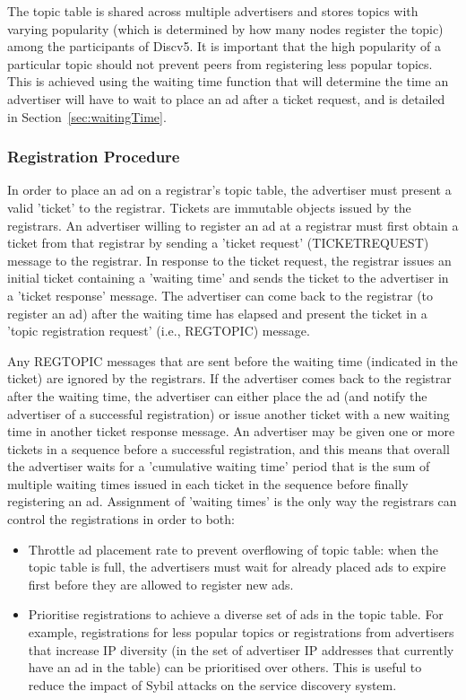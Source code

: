 The topic table is shared across multiple advertisers and stores topics with varying popularity (which is determined by how many nodes register the topic) among the participants of Discv5. 
It is important that the high popularity of a particular topic should not prevent peers from registering less popular topics. 
This is achieved using the waiting time function that will determine the time an advertiser will have to wait to place an ad after a ticket request,  and is detailed in Section~\ref{sec:waitingTime}.

\subsubsection{Registration Procedure}

In order to place an ad on a registrar's topic table, the advertiser must present a valid 'ticket' to the registrar. Tickets are immutable objects issued by the registrars. An advertiser willing to register an ad at a registrar must first obtain a ticket from that registrar by sending a 'ticket request' (TICKETREQUEST) message to the registrar. In response to the ticket request, the registrar issues an initial ticket containing a 'waiting time' and sends the ticket to the advertiser in a 'ticket response' message. The advertiser can come back to the registrar (to register an ad) after the waiting time has elapsed and present the ticket in a 'topic registration request' (i.e., REGTOPIC) message.

Any REGTOPIC messages that are sent before the waiting time (indicated in the ticket) are ignored by the registrars. If the advertiser comes back to the registrar after the waiting time, the advertiser can either place the ad (and notify the advertiser of a successful registration) or issue another ticket with a new waiting time in another ticket response message. An advertiser may be given one or more tickets in a sequence before a successful registration, and this means that overall the advertiser waits for a 'cumulative waiting time' period that is the sum of multiple waiting times issued in each ticket in the sequence before finally registering an ad. Assignment of 'waiting times' is the only way the registrars can control the registrations in order to both:

\begin{itemize}
    \item Throttle ad placement rate to prevent overflowing of topic table: when the topic table is full, the advertisers must wait for already placed ads to expire first before they are allowed to register new ads.
    \item Prioritise registrations to achieve a diverse set of ads in the topic table. For example, registrations for less popular topics or registrations from advertisers that increase IP diversity (in the set of advertiser IP addresses that currently have an ad in the table) can be prioritised over others. This is useful to reduce the impact of Sybil attacks on the service discovery system.
\end{itemize}

